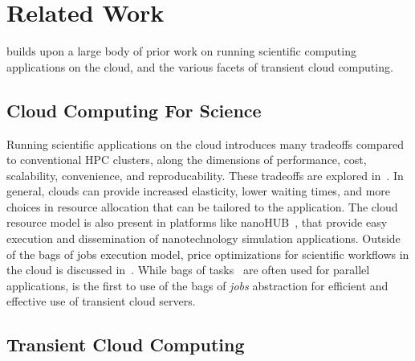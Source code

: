 \vspace*{\subsecspace}
\section{Related Work}
\label{sec:related}
\sysname builds upon a large body of prior work on running scientific computing applications on the cloud, and the various facets of transient cloud computing.  

\vspace*{\subsecspace}
\subsection{Cloud Computing For Science}
Running scientific applications on the cloud introduces many tradeoffs compared to conventional HPC clusters, along the dimensions of performance, cost, scalability, convenience, and reproducability.
These tradeoffs are explored in~\cite{iosup_performance_2011, zhai_cloud_2011, marathe2013comparative, galante_analysis_2016, benedictis_cloud-aware_2014}.
In general, clouds can provide increased elasticity, lower waiting times, and more choices in resource allocation that can be tailored to the application.
The cloud resource model is also present in platforms like nanoHUB~\cite{nanohub}, that provide easy execution and dissemination of nanotechnology simulation applications.
Outside of the bags of jobs execution model, price optimizations for scientific workflows in the cloud is discussed in~\cite{gari_learning_2019}. 
While bags of tasks~\cite{varshney_autobot_2019} are often used for parallel applications, \sysname is the first to use of the bags of \emph{jobs} abstraction for efficient and effective use of transient cloud servers. 

\vspace*{\subsecspace}
\subsection{Transient Cloud Computing}

